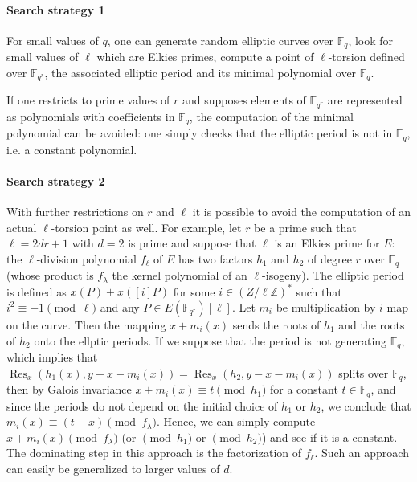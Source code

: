 \documentclass[12pt]{article}
\theoremstyle{plain}
\theoremstyle{definition}
\DeclareMathOperator{\Res}{Res}
\def\Z{\ensuremath{\mathbb{Z}}}
\def\F{\ensuremath{\mathbb{F}}}
\begin{document}
\paragraph{Search strategy 1}
For small values of $q$,
one can generate random elliptic curves over $\F_q$,
look for small values of $\ell$ which are Elkies primes,
compute a point of $\ell$-torsion defined over $\F_{q^r}$,
the associated elliptic period and its minimal polynomial over $\F_q$.

If one restricts to prime values of $r$ and supposes elements
of $\F_{q^r}$ are represented as polynomials with coefficients in $\F_q$,
the computation of the minimal polynomial can be avoided:
one simply checks that the elliptic period is not in $\F_q$,
i.e. a constant polynomial.

\paragraph{Search strategy 2}
With further restrictions on $r$ and $\ell$ it is possible to avoid
the computation of an actual $\ell$-torsion point as well.
For example, let $r$ be a prime such that $\ell = 2 d r + 1$
with $d = 2$ is prime
and suppose that $\ell$ is an Elkies prime for $E$:
the $\ell$-division polynomial $f_\ell$ of $E$ has two factors
$h_1$ and $h_2$ of degree $r$ over $\F_{q}$
(whose product is $f_\lambda$ the kernel polynomial of an $\ell$-isogeny).
The elliptic period is defined as $x(P) + x([i] P)$ for some
$i \in \left(Z / \ell \Z\right)^*$ such that $i^2 \equiv -1 \pmod{\ell}$
and any $P \in E(\F_{q^r})[\ell]$.
Let $m_i$ be multiplication by $i$ map on the curve.
Then the mapping $x + m_i(x)$ sends the roots of $h_1$
and the roots of $h_2$ onto the ellptic periods.
If we suppose that the period is not generating $\F_{q}$, which implies that
$\Res_x(h_1(x),y-x-m_i(x)) = \Res_x(h_2,y-x-m_i(x))$
splits over $\F_{q}$,
then by Galois invariance $x + m_i(x) \equiv t \pmod{h_1}$
for a constant $t \in \F_{q}$,
and since the periods do not depend on the initial choice of $h_1$
or $h_2$,
we conclude that $m_i(x) \equiv (t-x) \pmod{f_\lambda}$.
Hence, we can simply compute $x + m_i(x) \pmod{f_\lambda}$ (or $\pmod{h_1}$
or $\pmod{h_2}$) and see if it is a constant.
The dominating step in this approach is the factorization of $f_\ell$.
Such an approach can easily be generalized to larger values of $d$.
\end{document}
